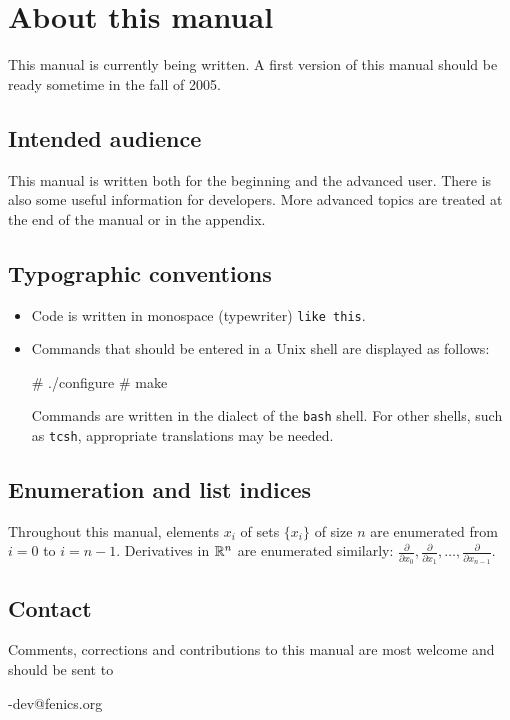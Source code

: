 
\chapter*{About this manual}

This manual is currently being written. A first version of this manual
should be ready sometime in the fall of 2005.

\section*{Intended audience}

This manual is written both for the beginning and the advanced user.
There is also some useful information for developers. More advanced topics
are treated at the end of the manual or in the appendix.

\section*{Typographic conventions}

\begin{itemize}
\item
  Code is written in monospace (typewriter) \texttt{like this}.
\item
  Commands that should be entered in a Unix shell
  are displayed as follows:
  \begin{code}
    # ./configure
    # make
  \end{code}
  Commands are written in the dialect of the \texttt{bash} shell. For
  other shells, such as \texttt{tcsh}, appropriate translations may be
  needed.
\end{itemize}

\section*{Enumeration and list indices}

Throughout this manual, elements $x_i$ of sets $\{x_i\}$ of size $n$
are enumerated from $i = 0$ to $i = n-1$. Derivatives in $\mathbb{R}^n$ are
enumerated similarly:
$\frac{\partial}{\partial x_0}, \frac{\partial}{\partial x_1},
 \ldots, \frac{\partial}{\partial x_{n-1}}$.

\section*{Contact}

Comments, corrections and contributions to this manual are most welcome
and should be sent to
\begin{code}
  \packagett{}-dev@fenics.org    
\end{code}
